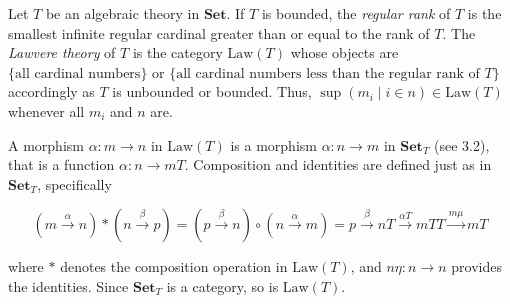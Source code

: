 Let $T$ be an algebraic theory in $\mathbf{Set}$. If $T$ is bounded, the \textit{regular rank} of $T$ is the smallest infinite regular cardinal greater than or equal to the rank of $T$. The \textit{Lawvere theory} of $T$ is the category $\mathrm{Law}(T)$ whose objects are $\{\text{all cardinal numbers}\}$ or $\{\text{all cardinal numbers less than the regular rank of } T\}$ accordingly as $T$ is unbounded or bounded. Thus, $\sup(m_i \mid i \in n) \in \mathrm{Law}(T)$ whenever all $m_i$ and $n$ are.

A morphism $\alpha: m \longrightarrow n$ in $\mathrm{Law}(T)$ is a morphism $\alpha: n \longrightarrow m$ in $\mathbf{Set}_T$ (see 3.2), that is a function $\alpha: n \longrightarrow mT$. Composition and identities are defined just as in $\mathbf{Set}_T$, specifically

$$
(m \xrightarrow{\alpha} n) * (n \xrightarrow{\beta} p) = (p \xrightarrow{\beta} n) \circ (n \xrightarrow{\alpha} m) = p \xrightarrow{\beta} nT \xrightarrow{\alpha T} mTT \xrightarrow{m\mu} mT
$$

where $*$ denotes the composition operation in $\mathrm{Law}(T)$, and $n\eta: n \longrightarrow n$ provides the identities. Since $\mathbf{Set}_T$ is a category, so is $\mathrm{Law}(T)$.
